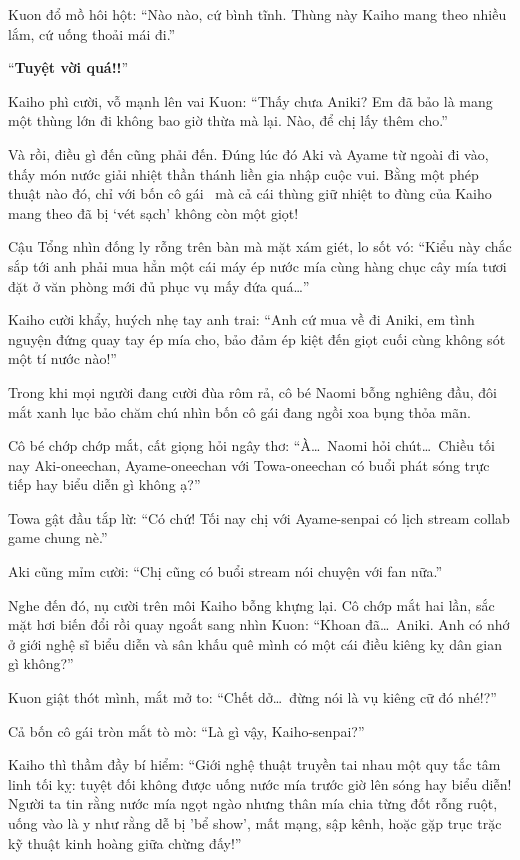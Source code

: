\documentclass[../main.tex]{subfiles}
\begin{document}
Kuon đổ mồ hôi hột: ``Nào nào, cứ bình tĩnh. Thùng này Kaiho mang theo nhiều lắm, cứ uống thoải mái đi.''

``\textbf{Tuyệt vời quá!!}''

Kaiho phì cười, vỗ mạnh lên vai Kuon: ``Thấy chưa Aniki? Em đã bảo là mang một thùng lớn đi không bao giờ thừa mà lại. Nào, để chị lấy thêm cho.''

Và rồi, điều gì đến cũng phải đến. Đúng lúc đó Aki và Ayame từ ngoài đi vào, thấy món nước giải nhiệt thần thánh liền gia nhập cuộc vui. Bằng một phép thuật nào đó, chỉ với bốn cô gái \hll\ mà cả cái thùng giữ nhiệt to đùng của Kaiho mang theo đã bị `vét sạch' không còn một giọt!

Cậu Tổng nhìn đống ly rỗng trên bàn mà mặt xám giét, lo sốt vó: ``Kiểu này chắc sắp tới anh phải mua hẳn một cái máy ép nước mía cùng hàng chục cây mía tươi đặt ở văn phòng mới đủ phục vụ mấy đứa quá\dots''

Kaiho cười khẩy, huých nhẹ tay anh trai: ``Anh cứ mua về đi Aniki, em tình nguyện đứng quay tay ép mía cho, bảo đảm ép kiệt đến giọt cuối cùng không sót một tí nước nào!''

Trong khi mọi người đang cười đùa rôm rả, cô bé Naomi bỗng nghiêng đầu, đôi mắt xanh lục bảo chăm chú nhìn bốn cô gái đang ngồi xoa bụng thỏa mãn.

Cô bé chớp chớp mắt, cất giọng hỏi ngây thơ: ``À\dots\ Naomi hỏi chút\dots\ Chiều tối nay Aki-oneechan, Ayame-oneechan với Towa-oneechan có buổi phát sóng trực tiếp hay biểu diễn gì không ạ?''

Towa gật đầu tắp lừ: ``Có chứ! Tối nay chị với Ayame-senpai có lịch stream collab game chung nè.''

Aki cũng mỉm cười: ``Chị cũng có buổi stream nói chuyện với fan nữa.''

Nghe đến đó, nụ cười trên môi Kaiho bỗng khựng lại. Cô chớp mắt hai lần, sắc mặt hơi biến đổi rồi quay ngoắt sang nhìn Kuon: ``Khoan đã\dots\ Aniki. Anh có nhớ ở giới nghệ sĩ biểu diễn và sân khấu quê mình có một cái điều kiêng kỵ dân gian gì không?''

Kuon giật thót mình, mắt mở to: ``Chết dở\dots\ đừng nói là vụ kiêng cữ đó nhé!?''

Cả bốn cô gái tròn mắt tò mò: ``Là gì vậy, Kaiho-senpai?''

Kaiho thì thầm đầy bí hiểm: ``Giới nghệ thuật truyền tai nhau một quy tắc tâm linh tối kỵ: tuyệt đối không được uống nước mía trước giờ lên sóng hay biểu diễn! Người ta tin rằng nước mía ngọt ngào nhưng thân mía chia từng đốt rỗng ruột, uống vào là y như rằng dễ bị 'bể show', mất mạng, sập kênh, hoặc gặp trục trặc kỹ thuật kinh hoàng giữa chừng đấy!''
\end{document}
